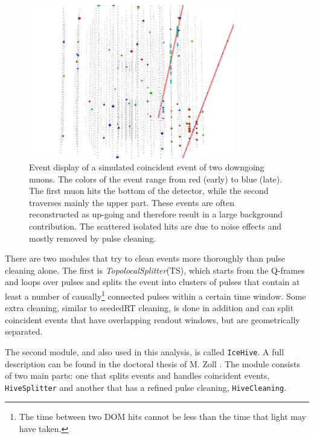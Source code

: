 \begin{figure}[t]
\centering
\includegraphics[width=0.8\textwidth]{chapter7/img/coincidenteventsCORS.png}
\caption{Event display of a simulated coincident event of two downgoing muons. The colors of the event range from red (early) to blue (late). The first muon hits the bottom of the detector, while the second traverses mainly the upper part. These events are often reconstructed as up-going and therefore result in a large background contribution. The scattered isolated hits are due to noise effects and mostly removed by pulse cleaning.}
\end{figure}

\noindent There are two modules that try to clean events more thoroughly than pulse cleaning alone. The first is \textit{TopolocalSplitter}(TS), which starts from the Q-frames and loops over pulses and splits the event into clusters of pulses that contain at least a number of causally\footnote{The time between two DOM hits cannot be less than the time that light may have taken.} connected pulses within a certain time window. Some extra cleaning, similar to seededRT cleaning, is done in addition and can split coincident events that have overlapping readout windows, but are geometrically separated.

The second module, and also used in this analysis, is called \texttt{IceHive}. A full description can be found in the doctoral thesis of M. Zoll \cite{mzollthesis}. The module consists of two main parts: one that splits events and handles coincident events, \texttt{HiveSplitter} and another that has a refined pulse cleaning, \texttt{HiveCleaning}.

